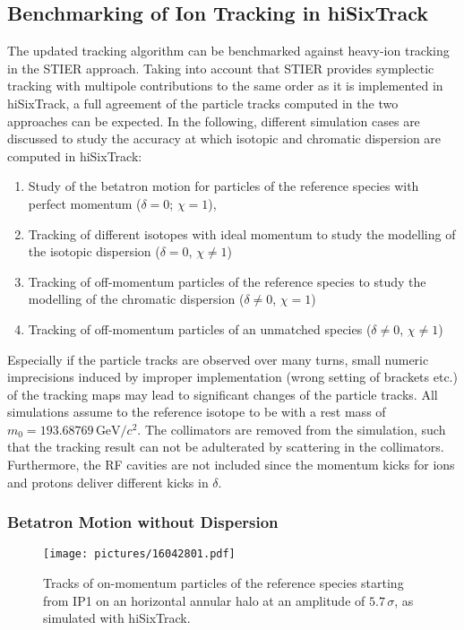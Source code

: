 \subsection{Benchmarking of Ion Tracking in hiSixTrack}

The updated tracking algorithm can be benchmarked against heavy-ion tracking in the STIER approach. Taking into account that STIER provides symplectic tracking with multipole contributions to the same order as it is implemented in hiSixTrack, a full agreement of the particle tracks computed in the two approaches can be expected. In the following, different simulation cases are discussed to study the accuracy  at which isotopic and chromatic dispersion are computed in hiSixTrack:
%
\begin{enumerate}
    \item Study of the betatron motion for particles of the reference species with perfect momentum ($\delta = 0$; $\chi=1$),
    \item Tracking of different isotopes with ideal momentum to study the modelling of the isotopic dispersion  ($\delta =0$, $\chi \neq 1$)
    \item Tracking of off-momentum particles of the reference species to study the modelling of the chromatic dispersion ($\delta \neq 0$, $\chi =1$)  
    \item Tracking of off-momentum particles of an unmatched species ($\delta \neq 0$, $\chi \neq 1$)
\end{enumerate}

Especially if the particle tracks are observed over many turns, small numeric imprecisions induced by improper implementation (wrong setting of brackets etc.) of the tracking maps may lead to significant changes of the particle tracks. All simulations assume to the reference isotope to be \lead with a rest mass of $m_0=193.68769\,\text{GeV}/c^2$. The collimators are removed from the simulation, such that the tracking result can not be adulterated by scattering in the collimators. Furthermore, the RF cavities are not included since the momentum kicks for ions and protons deliver different kicks in $\delta$.


\subsubsection{Betatron Motion without Dispersion}

\begin{figure}[t]  
    \centering
    \texttt{[image: pictures/16042801.pdf]}
    \caption{Tracks of on-momentum particles of the reference species starting from IP1 on an horizontal annular halo at an amplitude of $5.7\,\sigma$, as simulated with hiSixTrack.}  
    \label{pic:16042801}    %
\end{figure}



